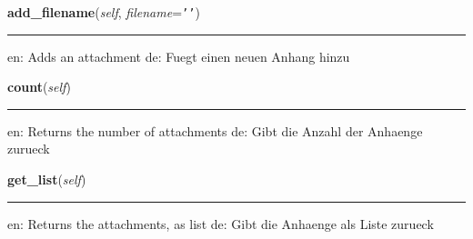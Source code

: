     \label{cuon:simplemail:Attachments:add_filename}

    \vspace{0.5ex}

\hspace{.8\funcindent}\begin{boxedminipage}{\funcwidth}

    \raggedright \textbf{add\_filename}(\textit{self}, \textit{filename}={\tt \texttt{'}\texttt{}\texttt{'}})

    \vspace{-1.5ex}

    \rule{\textwidth}{0.5\fboxrule}
\setlength{\parskip}{2ex}
    en: Adds an attachment de: Fuegt einen neuen Anhang hinzu

\setlength{\parskip}{1ex}
    \end{boxedminipage}

    \label{cuon:simplemail:Attachments:count}

    \vspace{0.5ex}

\hspace{.8\funcindent}\begin{boxedminipage}{\funcwidth}

    \raggedright \textbf{count}(\textit{self})

    \vspace{-1.5ex}

    \rule{\textwidth}{0.5\fboxrule}
\setlength{\parskip}{2ex}
    en: Returns the number of attachments de: Gibt die Anzahl der Anhaenge 
    zurueck

\setlength{\parskip}{1ex}
    \end{boxedminipage}

    \label{cuon:simplemail:Attachments:get_list}

    \vspace{0.5ex}

\hspace{.8\funcindent}\begin{boxedminipage}{\funcwidth}

    \raggedright \textbf{get\_list}(\textit{self})

    \vspace{-1.5ex}

    \rule{\textwidth}{0.5\fboxrule}
\setlength{\parskip}{2ex}
    en: Returns the attachments, as list de: Gibt die Anhaenge als Liste 
    zurueck

\setlength{\parskip}{1ex}
    \end{boxedminipage}


